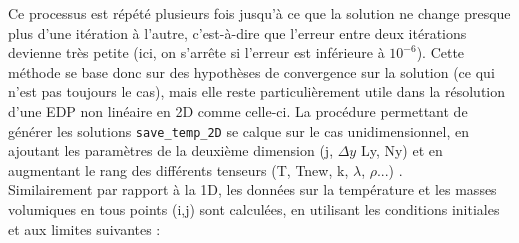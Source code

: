 \documentclass[a4paper,11pt]{article}
\begin{document}
Ce processus est répété plusieurs fois jusqu’à ce que la solution ne change presque plus d’une itération à l’autre, c’est-à-dire que l’erreur entre deux itérations devienne très petite (ici, on s’arrête si l’erreur est inférieure à $10^{-6}$). Cette méthode se base donc sur des hypothèses de convergence sur la solution (ce qui n'est pas toujours le cas), mais elle reste particulièrement utile dans la résolution d'une EDP non linéaire en 2D comme celle-ci. La procédure permettant de générer les solutions \texttt{save\_temp\_2D} se calque sur le cas unidimensionnel, en ajoutant les paramètres de la deuxième dimension (j, $\Delta y$ Ly, Ny) et en augmentant le rang des différents tenseurs (T, Tnew, k, $\lambda$, $\rho$...) . \\

Similairement par rapport à la 1D, les données sur la température et les masses volumiques en tous points (i,j) sont calculées, en utilisant les conditions initiales et aux limites suivantes :


\begin{center}
\end{center}
\end{document}
